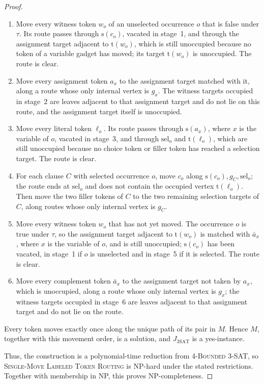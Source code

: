 \documentclass[a4paper,USenglish,thm-restate]{lipics-v2021}
\newcommand{\src}{\mathrm{s}}
\newcommand{\tgt}{\mathrm{t}}
\theoremstyle{problemstyle}
\begin{document}
\begin{proof}
\begin{enumerate}
\item Move every witness token $w_o$ of an unselected occurrence $o$ that
is false under $\tau$. Its route passes through $\src(c_o)$, vacated in
stage~1, and through the assignment target adjacent to $\tgt(w_o)$, which
is still unoccupied because no token of a variable gadget has moved; its
target $\tgt(w_o)$ is unoccupied. The route is clear.

\item Move every assignment token $a_x$ to the assignment target matched
with it, along a route whose only internal vertex is $g_x$. The witness
targets occupied in stage~2 are leaves adjacent to that assignment target
and do not lie on this route, and the assignment target itself is
unoccupied.

\item Move every literal token $\ell_o$. Its route passes through
$\src(a_x)$, where $x$ is the variable of $o$, vacated in stage~3, and
through $\mathrm{sel}_o$ and $\tgt(\ell_o)$, which are still unoccupied
because no choice token or filler token has reached a selection target.
The route is clear.

\item For each clause $C$ with selected occurrence $o$, move $c_o$ along
$\src(c_o),g_C,\mathrm{sel}_o$; the route ends at $\mathrm{sel}_o$ and does not contain the occupied vertex $\tgt(\ell_o)$. Then move the two
filler tokens of $C$ to the two remaining selection targets of $C$, along
routes whose only internal vertex is $g_C$.

\item Move every witness token $w_o$ that has not yet moved. The
occurrence $o$ is true under $\tau$, so the assignment target adjacent to
$\tgt(w_o)$ is matched with $\bar a_x$, where $x$ is the variable of $o$,
and is still unoccupied; $\src(c_o)$ has been vacated, in stage~1 if $o$
is unselected and in stage~5 if it is selected. The route is clear.

\item Move every complement token $\bar a_x$ to the assignment target not
taken by $a_x$, which is unoccupied, along a route whose only internal
vertex is $g_x$; the witness targets occupied in stage~6 are leaves
adjacent to that assignment target and do not lie on the route.
\end{enumerate}

Every token moves exactly once along the unique path of its pair in $M$.
Hence $M$, together with this movement order, is a solution, and $J_{\mathrm{3SAT}}$ is a
yes-instance.

\smallskip
Thus, the construction is a polynomial-time reduction from
\textsc{4-Bounded 3-SAT}, so \textsc{Single-Move Labeled Token Routing} is
\textsf{NP}-hard under the stated restrictions. Together with membership in
\textsf{NP}, this proves \textsf{NP}-completeness.
\end{proof}
\end{document}
